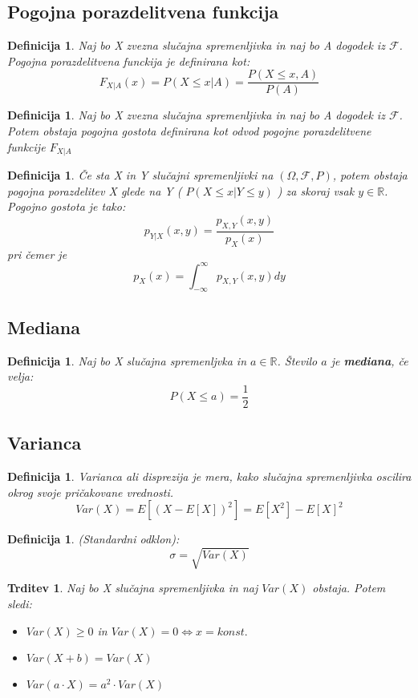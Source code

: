 \documentclass[11pt]{article}
\newtheorem{Trditev}[Izrek]{{\sc Trditev}}
\newtheorem{Definicija}[Izrek]{{\sc Definicija}}
\begin{document}
\subsection{Pogojna porazdelitvena funkcija}
\begin{Definicija}
Naj bo X zvezna slučajna spremenljivka in naj bo A dogodek iz $\mathcal{F}$. Pogojna porazdelitvena funckija je definirana kot:
$$F_{X|A}(x) = P(X\le x | A) = \frac{P(X\le x, A)}{P(A)}$$
\end{Definicija}
\begin{Definicija}
Naj bo X zvezna slučajna spremenljivka in naj bo A dogodek iz $\mathcal{F}$. Potem obstaja pogojna gostota definirana kot odvod pogojne porazdelitvene funkcije $F_{X|A}$
\end{Definicija}
\begin{Definicija}
Če sta X in Y slučajni spremenljivki na $(\Omega,\mathcal{F},P)$, potem obstaja pogojna porazdelitev X glede na Y ( $  P(X \le x | Y \le y) $ ) za skoraj vsak $y\in \mathbb{R}$. Pogojno gostota je tako:
$$p_{Y|X}(x,y) = \frac{p_{X,Y}(x,y)}{p_X(x)}$$
pri čemer je $$p_X(x) = \int_{-\infty}^{\infty} p_{X,Y}(x,y) dy$$ 
\end{Definicija}
\subsection{Mediana}
\begin{Definicija}
Naj bo X slučajna spremenljvka in $a\in \mathbb{R}$. Število $a$ je \textbf{mediana}, če velja: $$P(X\le a) = \frac{1}{2}$$
\end{Definicija}
\subsection{Varianca}
\begin{Definicija}
Varianca ali disprezija je mera, kako slučajna spremenljivka oscilira okrog svoje pričakovane vrednosti. $$Var(X) = E [( X - E[X])^2] = E[X^2] - E[X]^2$$
\end{Definicija}
\begin{Definicija}
(Standardni odklon):
$$\sigma = \sqrt{Var(X)}$$
\end{Definicija}
\begin{Trditev}
Naj bo X slučajna spremenljivka in naj $Var(X)$ obstaja. Potem sledi:
\begin{itemize}
\item
$Var(X) \ge 0$ in $Var(X) = 0 \iff x = konst.$
\item
$Var(X + b) = Var(X)$
\item
$Var(a \cdot X) = a^2 \cdot Var(X)$
\end{itemize}
\end{Trditev}
\end{document}

